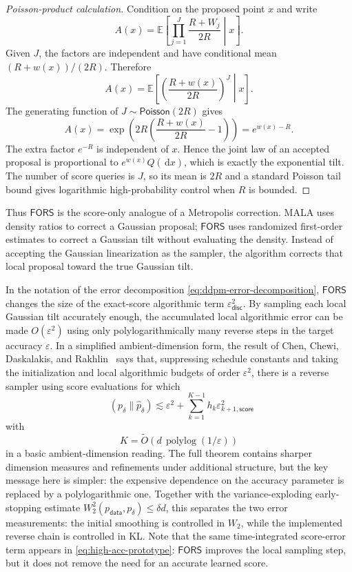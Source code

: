 \documentclass[10pt,a4paper]{amsart}
\numberwithin{equation}{section}
\DeclareMathOperator{\KL}{D_{\mathsf{KL}}}
\DeclareMathOperator{\polylog}{polylog}
\newcommand{\E}{\mathbb{E}}
\newcommand{\dd}{\,\mathrm{d}}
\newcommand{\wh}[1]{\widehat{#1}}
\newcommand{\eps}{\varepsilon}
\newcommand{\pdata}{p_{\mathsf{data}}}
\newcommand{\epsdisc}{\varepsilon_{\mathsf{disc}}}
\newcommand{\Poi}{\mathsf{Poisson}}
\newcommand{\tO}{\widetilde O}
\newcommand{\AlgFORS}{\textsf{FORS}}
\begin{document}
\begin{proof}[Poisson-product calculation]
Condition on the proposed point $x$ and write
\[
    A(x)
    =
    \E\left[
    \prod_{j=1}^{J}\frac{R+W_j}{2R}
    \middle| x
    \right].
\]
Given $J$, the factors are independent and have conditional mean
$(R+w(x))/(2R)$.  Therefore
\[
    A(x)
    =
    \E\left[
    \left(\frac{R+w(x)}{2R}\right)^J
    \middle| x
    \right].
\]
The generating function of $J\sim\Poi(2R)$ gives
\[
    A(x)
    =
    \exp\!\left(2R\left(\frac{R+w(x)}{2R}-1\right)\right)
    =
    e^{w(x)-R}.
\]
The extra factor $e^{-R}$ is independent of $x$.  Hence the joint law of an
accepted proposal is proportional to $e^{w(x)}Q(\dd x)$, which is exactly the
exponential tilt.  The number of score queries is $J$, so its mean is $2R$ and a
standard Poisson tail bound gives logarithmic high-probability control when
$R$ is bounded.
\end{proof}

Thus $\AlgFORS$ is the score-only analogue of a Metropolis correction.  MALA
uses density ratios to correct a Gaussian proposal; $\AlgFORS$ uses randomized
first-order estimates to correct a Gaussian tilt without evaluating the
density.  Instead of accepting the Gaussian linearization as the sampler, the
algorithm corrects that local proposal toward the true Gaussian tilt.

In the notation of the error decomposition \eqref{eq:ddpm-error-decomposition}, $\AlgFORS$
changes the size of the exact-score algorithmic term
$\epsdisc^2$.  By sampling each local Gaussian tilt accurately
enough, the accumulated local algorithmic error can be made $O(\eps^2)$
using only polylogarithmically many reverse steps in the target accuracy
$\eps$.  In a simplified ambient-dimension form, the result of Chen,
Chewi, Daskalakis, and Rakhlin~\cite{chen2026highaccuracy} says that,
suppressing schedule constants and taking the initialization and local
algorithmic budgets of order $\eps^2$, there is a reverse sampler using
score evaluations for which
\begin{equation}\label{eq:high-acc-prototype}
    \KL(p_\delta\|\wh p_\delta)
    \lesssim
    \eps^2
    +
    \sum_{k=1}^{K-1}
    h_k\eps_{k+1,\mathsf{score}}^2
\end{equation}
with
\[
    K
    =
    \tO\!\left(d\,\polylog(1/\eps)\right)
\]
in a basic ambient-dimension reading.  The full theorem contains sharper
dimension measures and refinements under additional structure, but the key
message here is simpler: the expensive dependence on the accuracy parameter is
replaced by a polylogarithmic one.  Together with the variance-exploding
early-stopping estimate $W_2^2(\pdata,p_\delta)\leq \delta d$, this separates
the two error measurements: the initial smoothing is controlled in $W_2$, while
the implemented reverse chain is controlled in KL\@.
Note that the same
time-integrated score-error term appears in \eqref{eq:high-acc-prototype}:
$\AlgFORS$ improves the local sampling step, but it does not remove the need
for an accurate learned score.
\end{document}
